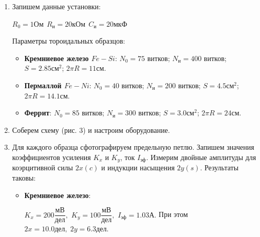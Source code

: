 \documentclass[12pt]{lab}
\begin{document}
\begin{enumerate}
    \item Запишем данные установки:

        $R_{0}=1 \text{Ом} \ \ R_\text{и}=20 \text{кОм} \ \ C_\text{и}=20
        \text{мкФ} $

        Параметры тороидальных образцов:

        \begin{itemize}
            \item   \textbf{Кремниевое железо $ Fe-Si $}:
                $N_{0}=75$ витков;
                $N_\text{и}=400$ витков;
                $S=2.85 \text{см}^{2}$;
                $2\pi R = 11 \text{см} $.

            \item  \textbf{Пермаллой $ Fe-Ni $}:
                $N_{0}=40$ витков;
                $N_\text{и}=200$ витков;
                $S = 4.5 \text{см}^{2}$;
                $2\pi R = 14.1 \text{см} $.

            \item  \textbf{Феррит}:
                $N_{0}=85$ витков;
                $N_\text{и}=300$ витков;
                $S=3.0 \text{см}^{2}$;
                $2\pi R = 24 \text{см} $.
        \end{itemize}

    \item Соберем схему (рис. 3) и настроим оборудование.

    \item Для каждого образца сфотографируем предельную петлю.
        Запишем значения коэффициентов усиления $K_{x}$ и $K_{y}$,
        ток $I_\text{эф}$. Измерим двойные амплитуды для коэрцитивной силы
        $2x(c)$ и индукции насыщения $2y(s)$. Результаты таковы:

        \begin{itemize}
            \item   \textbf{Кремниевое железо}:

                $K_{x}=200 \dfrac{\text{мВ}}{\text{дел}},$
                $K_{y}=100 \dfrac{\text{мВ}}{\text{дел}},$
                $I_\text{эф}=1.03 \text{А}. $
                При этом $ 2x = 10.0 \text{дел}, \; 2y = 6.3 \text{дел}$.


\end{itemize}
\end{enumerate}
\end{document}
